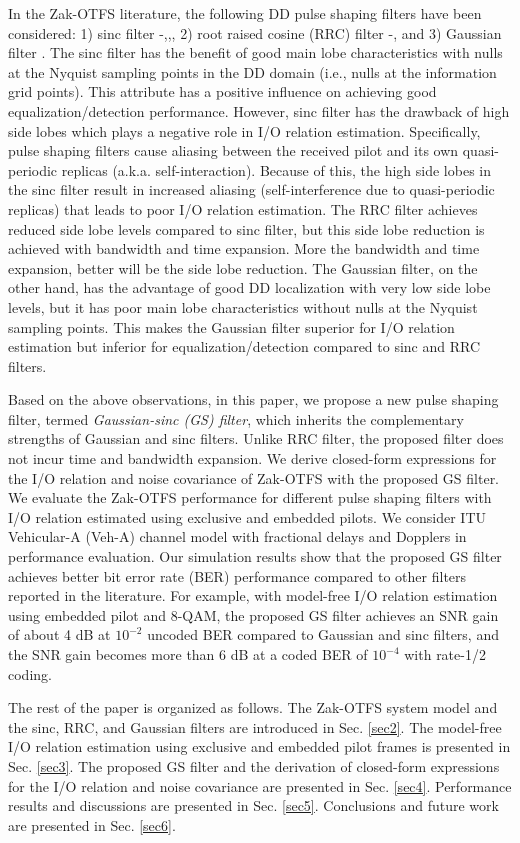 In the Zak-OTFS literature, the following DD pulse shaping filters have been considered: 1) sinc filter
\cite{zak_otfs2}-\cite{zak_otfs5},\cite{zak_otfs9},\cite{zak_otfs8},
2) root raised cosine (RRC) filter \cite{zak_otfs2}-\cite{zak_otfs9}, and 3) Gaussian filter \cite{zak_otfs7}. The sinc filter has the benefit of good main lobe characteristics with nulls at the Nyquist sampling points in the DD domain (i.e., nulls at the information grid points). This attribute has a positive influence on achieving good equalization/detection performance. However, sinc filter has the drawback of high side lobes which plays a negative role in I/O relation estimation. Specifically, pulse shaping filters cause aliasing between the received pilot and its own quasi-periodic replicas (a.k.a. self-interaction). Because of this, the high side lobes in the sinc filter result in increased aliasing (self-interference due to quasi-periodic replicas) that leads to poor I/O relation estimation. The RRC filter achieves reduced side lobe levels compared to sinc filter, but this side lobe reduction is achieved with bandwidth and time expansion. More the bandwidth and time expansion, better will be the side lobe reduction. The Gaussian filter, on the other hand, has the advantage of good DD localization with very low side lobe levels, but it has poor main lobe characteristics without nulls at the Nyquist sampling points. This makes the Gaussian filter superior for I/O relation estimation but inferior for equalization/detection compared to sinc and RRC filters. 

Based on the above observations, in this paper, we propose a new pulse shaping filter, termed {\em Gaussian-sinc (GS) filter}, which inherits the complementary strengths of Gaussian and sinc filters. Unlike RRC filter, the proposed filter does not incur time and bandwidth expansion. We derive closed-form expressions for the I/O relation and noise covariance of Zak-OTFS with the proposed GS filter. We evaluate the Zak-OTFS performance for different pulse shaping filters with I/O relation estimated using exclusive and embedded pilots. We consider ITU Vehicular-A (Veh-A) channel model \cite{ITU_VehA} with fractional delays and Dopplers in performance evaluation. Our simulation results show that the proposed GS filter achieves better bit error rate (BER) performance compared to other filters reported in the literature.  
For example, with model-free I/O relation estimation using embedded pilot and 8-QAM, the proposed GS filter achieves an SNR gain of about 4 dB at $10^{-2}$ uncoded BER compared to Gaussian and sinc filters, and the SNR gain becomes more than 6 dB  at a coded BER of $10^{-4}$ with rate-1/2 coding.

The rest of the paper is organized as follows. The Zak-OTFS system model and the sinc, RRC, and Gaussian filters are introduced in Sec. \ref{sec2}. The model-free I/O relation estimation using exclusive and embedded pilot frames is presented in Sec. \ref{sec3}. The proposed GS filter and the derivation of closed-form expressions for the I/O relation and noise covariance are presented in Sec. \ref{sec4}. Performance results and discussions are presented in Sec. \ref{sec5}. Conclusions and future work are presented in Sec. \ref{sec6}. 